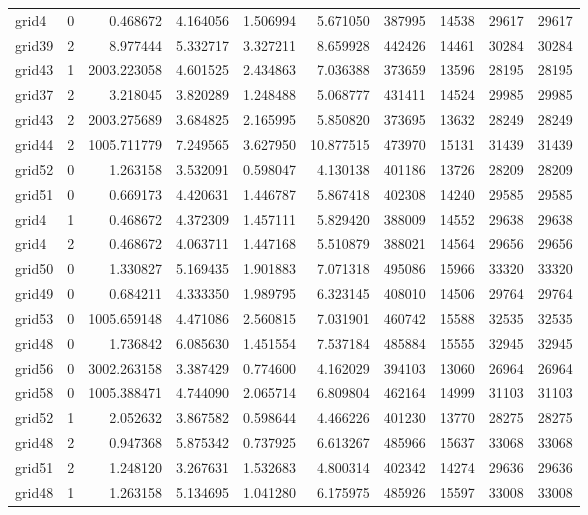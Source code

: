 \begin{longtable}{|l|r|r|r|r|r|r|r|r|r|}
grid4 & 0 & 0.468672 & 4.164056 & 1.506994 & 5.671050 & 387995 & 14538 & 29617 & 29617 \\
grid39 & 2 & 8.977444 & 5.332717 & 3.327211 & 8.659928 & 442426 & 14461 & 30284 & 30284 \\
grid43 & 1 & 2003.223058 & 4.601525 & 2.434863 & 7.036388 & 373659 & 13596 & 28195 & 28195 \\
grid37 & 2 & 3.218045 & 3.820289 & 1.248488 & 5.068777 & 431411 & 14524 & 29985 & 29985 \\
grid43 & 2 & 2003.275689 & 3.684825 & 2.165995 & 5.850820 & 373695 & 13632 & 28249 & 28249 \\
grid44 & 2 & 1005.711779 & 7.249565 & 3.627950 & 10.877515 & 473970 & 15131 & 31439 & 31439 \\
grid52 & 0 & 1.263158 & 3.532091 & 0.598047 & 4.130138 & 401186 & 13726 & 28209 & 28209 \\
grid51 & 0 & 0.669173 & 4.420631 & 1.446787 & 5.867418 & 402308 & 14240 & 29585 & 29585 \\
grid4 & 1 & 0.468672 & 4.372309 & 1.457111 & 5.829420 & 388009 & 14552 & 29638 & 29638 \\
grid4 & 2 & 0.468672 & 4.063711 & 1.447168 & 5.510879 & 388021 & 14564 & 29656 & 29656 \\
grid50 & 0 & 1.330827 & 5.169435 & 1.901883 & 7.071318 & 495086 & 15966 & 33320 & 33320 \\
grid49 & 0 & 0.684211 & 4.333350 & 1.989795 & 6.323145 & 408010 & 14506 & 29764 & 29764 \\
grid53 & 0 & 1005.659148 & 4.471086 & 2.560815 & 7.031901 & 460742 & 15588 & 32535 & 32535 \\
grid48 & 0 & 1.736842 & 6.085630 & 1.451554 & 7.537184 & 485884 & 15555 & 32945 & 32945 \\
grid56 & 0 & 3002.263158 & 3.387429 & 0.774600 & 4.162029 & 394103 & 13060 & 26964 & 26964 \\
grid58 & 0 & 1005.388471 & 4.744090 & 2.065714 & 6.809804 & 462164 & 14999 & 31103 & 31103 \\
grid52 & 1 & 2.052632 & 3.867582 & 0.598644 & 4.466226 & 401230 & 13770 & 28275 & 28275 \\
grid48 & 2 & 0.947368 & 5.875342 & 0.737925 & 6.613267 & 485966 & 15637 & 33068 & 33068 \\
grid51 & 2 & 1.248120 & 3.267631 & 1.532683 & 4.800314 & 402342 & 14274 & 29636 & 29636 \\
grid48 & 1 & 1.263158 & 5.134695 & 1.041280 & 6.175975 & 485926 & 15597 & 33008 & 33008 \\

\end{longtable}

